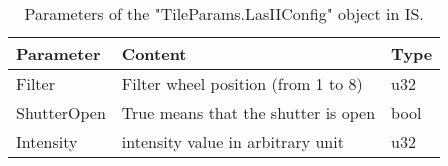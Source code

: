 \begin{table}[ht]
  \begin{center}
    \caption{Parameters of the "TileParams.LasIIConfig" object in IS.}\label{tab:IS:lasIIconfig}
    \begin{tabular}{lll}
      \hline\hline
      Parameter & Content & Type \\
      \hline
      Filter & Filter wheel position (from 1 to 8) & u32 \\
      ShutterOpen & True means that the shutter is open & bool \\
      Intensity & \las{} intensity value in arbitrary unit & u32 \\
      \hline
    \end{tabular}
  \end{center}
\end{table}

